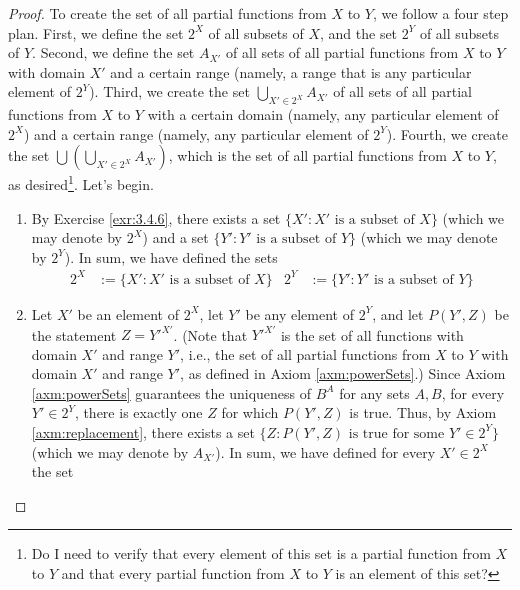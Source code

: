 \documentclass[../main.tex]{subfiles}
\begin{document}
\begin{enumerate}[ref={\thesection.\arabic*}]
    \begin{proof}
        To create the set of all partial functions from $X$ to $Y$, we follow a four step plan. First, we define the set $2^X$ of all subsets of $X$, and the set $2^Y$ of all subsets of $Y$. Second, we define the set $A_{X'}$ of all sets of all partial functions from $X$ to $Y$ with domain $X'$ and a certain range (namely, a range that is any particular element of $2^Y$). Third, we create the set $\bigcup_{X'\in 2^X}A_{X'}$ of all sets of all partial functions from $X$ to $Y$ with a certain domain (namely, any particular element of $2^X$) and a certain range (namely, any particular element of $2^Y$). Fourth, we create the set $\bigcup \left( \bigcup_{X'\in 2^X}A_{X'} \right)$, which is the set of all partial functions from $X$ to $Y$, as desired\footnote{Do I need to verify that every element of this set is a partial function from $X$ to $Y$ and that every partial function from $X$ to $Y$ is an element of this set?}. Let's begin.
        \begin{enumerate}[label={(\arabic*)}]
            \item By Exercise \ref{exr:3.4.6}, there exists a set $\{X':X'\text{ is a subset of }X\}$ (which we may denote by $2^X$) and a set $\{Y':Y'\text{ is a subset of }Y\}$ (which we may denote by $2^Y$). In sum, we have defined the sets
            \begin{align*}
                2^X &:= \{X':X'\text{ is a subset of }X\}&
                2^Y &:= \{Y':Y'\text{ is a subset of }Y\}
            \end{align*}
            \item Let $X'$ be an element of $2^X$, let $Y'$ be any element of $2^Y$, and let $P(Y',Z)$ be the statement $Z=Y'^{X'}$. (Note that $Y'^{X'}$ is the set of all functions with domain $X'$ and range $Y'$, i.e., the set of all partial functions from $X$ to $Y$ with domain $X'$ and range $Y'$, as defined in Axiom \ref{axm:powerSets}.) Since Axiom \ref{axm:powerSets} guarantees the uniqueness of $B^A$ for any sets $A,B$, for every $Y'\in 2^Y$, there is exactly one $Z$ for which $P(Y',Z)$ is true. Thus, by Axiom \ref{axm:replacement}, there exists a set $\{Z:P(Y',Z)\text{ is true for some }Y'\in 2^Y\}$ (which we may denote by $A_{X'}$). In sum, we have defined for every $X'\in 2^X$ the set

\end{enumerate}
\end{proof}
\end{enumerate}
\end{document}
